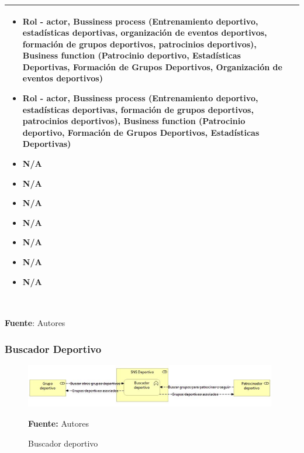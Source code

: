 \begin{table}[!htb]
\begin{center}
{\begin{tabular}{|p{7cm}|p{4cm}|}
\begin{itemize}
				\item Rol - actor, Bussiness process (Entrenamiento deportivo, estadísticas deportivas, organización de eventos deportivos, formación de grupos deportivos, patrocinios deportivos), Business function (Patrocinio deportivo, Estadísticas Deportivas, Formación de Grupos Deportivos, Organización de eventos deportivos)
				\item Rol - actor, Bussiness process (Entrenamiento deportivo, estadísticas deportivas, formación de grupos deportivos, patrocinios deportivos), Business function (Patrocinio deportivo, Formación de Grupos Deportivos, Estadísticas Deportivas)
				\item N/A
				\item N/A
				\item N/A
				\item N/A
				\item N/A
				\item N/A
				\item N/A
			\end{itemize} 
			\\
			\hline
		\end{tabular}
		} \\
		\textbf{Fuente}: Autores
	\end{center}
\end{table}

\subsubsection{Buscador Deportivo}

\begin{figure}[!htb]
  \begin{center}
    \includegraphics[width=11cm]{./imagenes/business_functions/buscadordeportivo.png}
    \caption{Buscador deportivo}
    \label{fig:BF_BuscadorDeportivo}
    \textbf{Fuente:}  Autores
  \end{center}
\end{figure}

